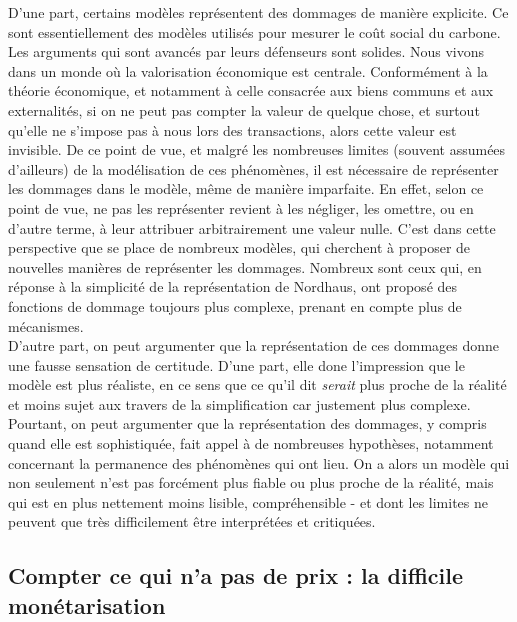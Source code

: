 D'une part, certains modèles représentent des dommages de manière explicite. Ce sont essentiellement des modèles utilisés pour mesurer le coût social du carbone. Les arguments qui sont avancés par leurs défenseurs sont solides. Nous vivons dans un monde où la valorisation économique est centrale. Conformément à la théorie économique, et notamment à celle consacrée aux biens communs et aux externalités, si on ne peut pas compter la valeur de quelque chose, et surtout qu'elle ne s'impose pas à nous lors des transactions, alors cette valeur est invisible. De ce point de vue, et malgré les nombreuses limites (souvent assumées d'ailleurs) de la modélisation de ces phénomènes, il est nécessaire de représenter les dommages dans le modèle, même de manière imparfaite. En effet, selon ce point de vue, ne pas les représenter revient à les négliger, les omettre, ou en d'autre terme, à leur attribuer arbitrairement une valeur nulle. 
C'est dans cette perspective que se place de nombreux modèles, qui cherchent à proposer de nouvelles manières de représenter les dommages. Nombreux sont ceux qui, en réponse à la simplicité de la représentation de Nordhaus, ont proposé des fonctions de dommage toujours plus complexe, prenant en compte plus de mécanismes. 
\\

D'autre part, on peut argumenter que la représentation de ces dommages donne une fausse sensation de certitude. D'une part, elle done l'impression que le modèle est plus réaliste, en ce sens que ce qu'il dit \textit{serait} plus proche de la réalité et moins sujet aux travers de la simplification car justement plus complexe. Pourtant, on peut argumenter que la représentation des dommages, y compris quand elle est sophistiquée, fait appel à de nombreuses hypothèses, notamment concernant la permanence des phénomènes qui ont lieu. On a alors un modèle qui non seulement n'est pas forcément plus fiable ou plus proche de la réalité, mais qui est en plus nettement moins lisible, compréhensible - et dont les limites ne peuvent que très difficilement être interprétées et critiquées. 

\subsection{Compter ce qui n'a pas de prix : la difficile monétarisation}



